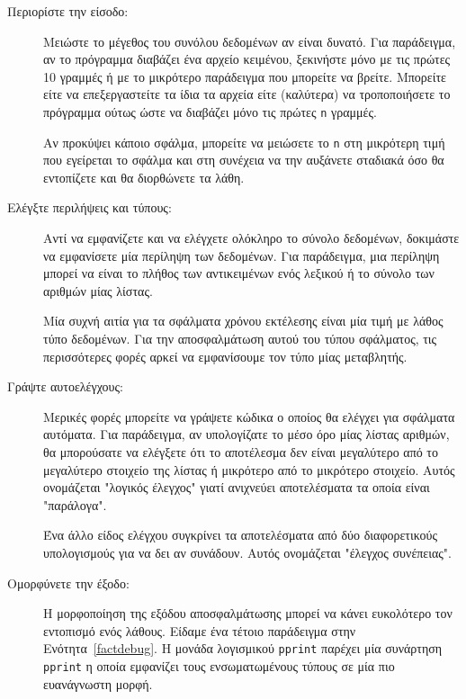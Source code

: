\documentclass[10pt]{book}
\begin{document}
\begin{description}

\item [Περιορίστε την είσοδο:] Μειώστε το μέγεθος του συνόλου δεδομένων αν είναι δυνατό. Για παράδειγμα, αν το πρόγραμμα διαβάζει ένα αρχείο κειμένου, ξεκινήστε μόνο με τις πρώτες 10 γραμμές ή με το μικρότερο παράδειγμα που μπορείτε να βρείτε. Μπορείτε είτε να επεξεργαστείτε τα ίδια τα αρχεία είτε (καλύτερα) να τροποποιήσετε το πρόγραμμα ούτως ώστε να διαβάζει μόνο τις πρώτες  {\tt n} γραμμές.

Αν προκύψει κάποιο σφάλμα, μπορείτε να μειώσετε το {\tt n} στη μικρότερη τιμή που εγείρεται το σφάλμα και στη συνέχεια να την αυξάνετε σταδιακά όσο θα εντοπίζετε και θα διορθώνετε τα λάθη.

\item [Ελέγξτε περιλήψεις και τύπους:] Αντί να εμφανίζετε και να ελέγχετε ολόκληρο το σύνολο δεδομένων, δοκιμάστε να εμφανίσετε μία περίληψη των δεδομένων. Για  παράδειγμα, μια περίληψη μπορεί να είναι το πλήθος των αντικειμένων ενός λεξικού ή το σύνολο των αριθμών μίας λίστας.

Μία συχνή αιτία για τα σφάλματα χρόνου εκτέλεσης είναι μία τιμή με λάθος τύπο δεδομένων. Για την αποσφαλμάτωση αυτού του τύπου σφάλματος, τις περισσότερες φορές αρκεί να εμφανίσουμε τον τύπο μίας μεταβλητής.

\item[Γράψτε αυτοελέγχους:] Μερικές φορές μπορείτε να γράψετε κώδικα ο οποίος θα ελέγχει για σφάλματα αυτόματα. Για παράδειγμα, αν υπολογίζατε το μέσο όρο μίας λίστας αριθμών, θα μπορούσατε να ελέγξετε ότι το αποτέλεσμα δεν είναι μεγαλύτερο από το μεγαλύτερο στοιχείο της λίστας ή μικρότερο από το μικρότερο στοιχείο. Αυτός ονομάζεται "λογικός έλεγχος" γιατί ανιχνεύει αποτελέσματα τα οποία είναι "παράλογα".

Ένα άλλο είδος ελέγχου συγκρίνει τα αποτελέσματα από δύο διαφορετικούς υπολογισμούς για να δει αν συνάδουν. Αυτός ονομάζεται "έλεγχος συνέπειας".

\item[Ομορφύνετε την έξοδο:] Η μορφοποίηση της εξόδου αποσφαλμάτωσης μπορεί να κάνει ευκολότερο τον εντοπισμό ενός λάθους. Είδαμε ένα τέτοιο παράδειγμα στην Ενότητα~\ref{factdebug}. Η μονάδα λογισμικού {\tt pprint} παρέχει μία συνάρτηση  {\tt pprint} η οποία εμφανίζει τους ενσωματωμένους τύπους σε μία πιο ευανάγνωστη μορφή. 

\end{description}
\end{document}
